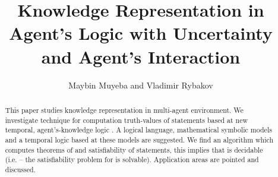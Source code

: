 \documentclass[runningheads]{llncs}
\begin{document}
\title{Knowledge Representation in Agent's Logic with Uncertainty and Agent's Interaction}



\author{Maybin Muyeba and Vladimir Rybakov}




\mainmatter

\maketitle









\newcommand{\pos}{\diamondsuit}
\newcommand{\cB}{\mathcal{B}}
\newcommand{\cK}{\mathcal{K}}
\newcommand{\cF}{\mathcal{F}}
\newcommand{\cm}{\mathcal{M}}
\newcommand{\cL}{\mathcal{L}}
\newcommand{\cC}{\mathcal{C}}
\newcommand{\cJ}{\mathcal{J}}
\newcommand{\bbZ}{\mathbb{Z}}
\newcommand{\vv}{\Vdash}
\newcommand{\nn}{\,\mathrm{Next}\,}  \newcommand{\N}{\mathrm{N}\,}        \newcommand{\pp}{\Diamond^+}
\newcommand{\uu}{\,\mathrm{Until}\,}
\newcommand{\und}{\,\&\,}
\newcommand{\Sk} {\mathrm{Sk}}
\newcommand{\Cl}{\mathop{Cl}\nolimits}
\newcommand{\Log}{\mathop{Log}}
\newcommand{\Ref}{\mathop{Ref}}
\newcommand{\Var}{\mathop{Var}}
\newcommand{\dom}{\mathop{dom}}
\newcommand{\Sub}{\mathop{Sub}}
\newcommand{\Fr} {\mathop{Fr}}
\newcommand{\logic}{\mathcal{T\!L}^{KnI,U}_{Dist}}
\newcommand{\llll}{\logic}
\newcommand{\td} {\mathrm{Today}}
\newcommand{\cz} {\mathcal{N}}
\newcommand{\mz} {\mathcal{N_C}}
\newcommand{\rf}[1]{{#1}_{\mathrm{rf}}}
\newcommand{\ppp}{\phi}









\begin{abstract}
This paper studies knowledge representation in multi-agent environment. We
 investigate technique for computation truth-values of statements based at
    new temporal, agent's-knowledge  logic . A logical language, mathematical symbolic models and a temporal logic  based at these models are suggested.
 We find an algorithm
which computes theorems of  and satisfiability of statements, this implies that  is
decidable (i.e. --  the satisfiability problem for  is solvable).
Application areas are pointed and discussed.
\end{abstract}
\end{document}
